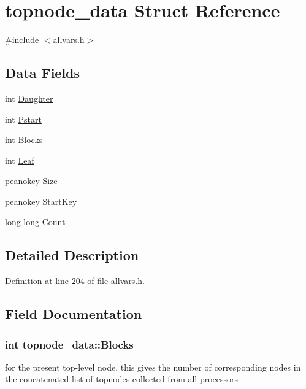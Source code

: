 \hypertarget{structtopnode__data}{
\section{topnode\_\-data Struct Reference}
\label{structtopnode__data}
}


{\ttfamily \#include $<$allvars.h$>$}

\subsection*{Data Fields}
\begin{DoxyCompactItemize}
\item 
int \hyperlink{structtopnode__data_ad2e76e39d74f3c299b38fa680ecdb794}{Daughter}
\item 
int \hyperlink{structtopnode__data_abe0b214b3cf372c95a16966304b1592c}{Pstart}
\item 
int \hyperlink{structtopnode__data_abad41cd99537e7a3a0d78ac5f291e42d}{Blocks}
\item 
int \hyperlink{structtopnode__data_aa5c48f2ae0bd1e2ed8ca069e4eeb29cd}{Leaf}
\item 
\hyperlink{allvars_8h_a63f10772bd5776dcb4b6301f425e0d26}{peanokey} \hyperlink{structtopnode__data_a7a06f0263a5602d4c073100a517892b8}{Size}
\item 
\hyperlink{allvars_8h_a63f10772bd5776dcb4b6301f425e0d26}{peanokey} \hyperlink{structtopnode__data_ab6ae6e924fec05c69ab73ddc2941e855}{StartKey}
\item 
long long \hyperlink{structtopnode__data_a3cae714f1f71f6ce4750004ee6fbda06}{Count}
\end{DoxyCompactItemize}


\subsection{Detailed Description}


Definition at line 204 of file allvars.h.



\subsection{Field Documentation}
\hypertarget{structtopnode__data_abad41cd99537e7a3a0d78ac5f291e42d}{
\subsubsection[{Blocks}]{\setlength{\rightskip}{0pt plus 5cm}int {\bf topnode\_\-data::Blocks}}}
\label{structtopnode__data_abad41cd99537e7a3a0d78ac5f291e42d}
for the present top-\/level node, this gives the number of corresponding nodes in the concatenated list of topnodes collected from all processors 

